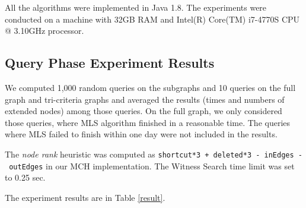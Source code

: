
All the algorithms were implemented in Java 1.8. The experiments were conducted on a machine with 
32GB RAM and Intel(R) Core(TM) i7-4770S CPU @ 3.10GHz processor.


\subsection{Query Phase Experiment Results}

We computed 1,000 random queries on the subgraphs and 10 queries on the full graph and tri-criteria graphs and averaged the results (times and numbers of extended nodes) among those queries. 
On the full graph, we only considered those queries, where MLS algorithm finished in a reasonable time. The queries where MLS failed to finish within one day were not included in the results. 

The {\em node rank} heuristic was computed as {\tt shortcut*3 + deleted*3 -~inEdges -~outEdges} in our MCH implementation. The Witness Search time limit was set to 0.25 sec. 

\noindent The experiment results are in Table \ref{result}. 

